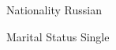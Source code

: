 

\begin{cvskills}

\cvskill
    {Nationality} %
    {Russian}

\cvskill
    {Marital Status} %
    {Single}

\end{cvskills}
